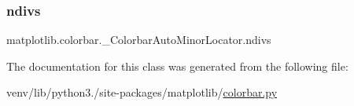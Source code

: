 \subsubsection{\texorpdfstring{ndivs}{ndivs}}
{\footnotesize\ttfamily matplotlib.\+colorbar.\+\_\+\+Colorbar\+Auto\+Minor\+Locator.\+ndivs}



The documentation for this class was generated from the following file\+:\begin{DoxyCompactItemize}
\item 
venv/lib/python3./site-\/packages/matplotlib/\hyperlink{colorbar_8py}{colorbar.\+py}\end{DoxyCompactItemize}
